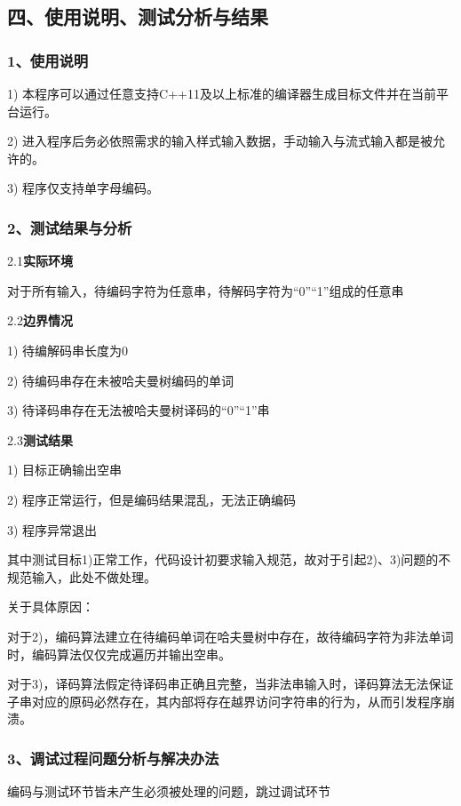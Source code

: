 \documentclass[UTF8, a4paper]{ctexart}
\begin{document}
\subsection*{四、使用说明、测试分析与结果}
\subsubsection*{1、使用说明}
1) 本程序可以通过任意支持C++11及以上标准的编译器生成目标文件并在当前平台运行。 \par
2) 进入程序后务必依照需求的输入样式输入数据，手动输入与流式输入都是被允许的。 \par
3) 程序仅支持单字母编码。 \par
\subsubsection*{2、测试结果与分析}
2.1\;\textbf{实际环境} \par
对于所有输入，待编码字符为任意串，待解码字符为“0”“1”组成的任意串 \par
2.2\;\textbf{边界情况} \par
1) 待编解码串长度为0 \par
2) 待编码串存在未被哈夫曼树编码的单词 \par
3) 待译码串存在无法被哈夫曼树译码的“0”“1”串 \par
2.3\;\textbf{测试结果} \par
1) 目标正确输出空串 \par
2) 程序正常运行，但是编码结果混乱，无法正确编码 \par
3) 程序异常退出 \par
其中测试目标1)正常工作，代码设计初要求输入规范，故对于引起2)、3)问题的不规范输入，此处不做处理。 \par
关于具体原因： \par
对于2)，编码算法建立在待编码单词在哈夫曼树中存在，故待编码字符为非法单词时，编码算法仅仅完成遍历并输出空串。 \par
对于3)，译码算法假定待译码串正确且完整，当非法串输入时，译码算法无法保证子串对应的原码必然存在，其内部将存在越界访问字符串的行为，从而引发程序崩溃。 \par
\subsubsection*{3、调试过程问题分析与解决办法}
编码与测试环节皆未产生必须被处理的问题，跳过调试环节
\end{document}
